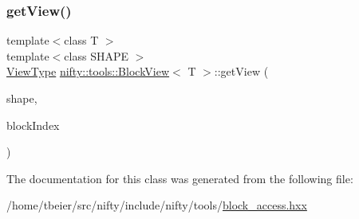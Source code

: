 \mbox{\label{classnifty_1_1tools_1_1BlockView_aa5844a6a85c4747084f64e44f1456fe7}} 
\subsubsection{\texorpdfstring{get\+View()}{getView()}\hspace{0.1cm}{\footnotesize\ttfamily [2/2]}}
{\footnotesize\ttfamily template$<$class T $>$ \\
template$<$class S\+H\+A\+PE $>$ \\
\hyperlink{classnifty_1_1tools_1_1BlockView_acaadee9e8a7dc696acf1ebad24bd431d}{View\+Type} \hyperlink{classnifty_1_1tools_1_1BlockView}{nifty\+::tools\+::\+Block\+View}$<$ T $>$\+::get\+View (\begin{DoxyParamCaption}\item[{const S\+H\+A\+PE \&}]{shape,  }\item[{const std\+::size\+\_\+t}]{block\+Index }\end{DoxyParamCaption})\hspace{0.3cm}{\ttfamily [inline]}}



The documentation for this class was generated from the following file\+:\begin{DoxyCompactItemize}
\item 
/home/tbeier/src/nifty/include/nifty/tools/\hyperlink{block__access_8hxx}{block\+\_\+access.\+hxx}\end{DoxyCompactItemize}
